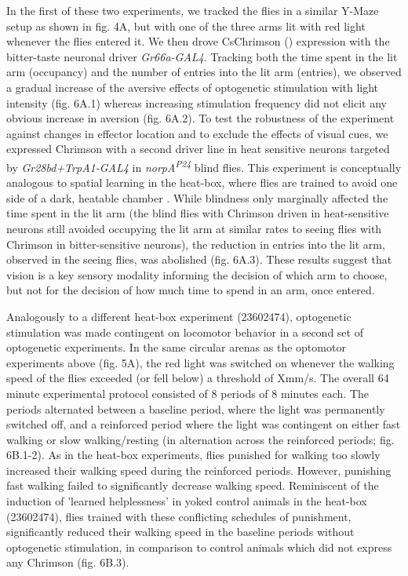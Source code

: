 \documentclass[10pt]{article}
\begin{document}
\begin{multicols}{2}
In the first of these two experiments, we tracked the flies in a similar Y-Maze setup as shown in fig. 4A, but with one of the three arms lit with red light whenever the flies entered it. We then drove CsChrimson (\cite{griebel_2014,Klapoetke_Independent_2014}) expression with the bitter-taste neuronal driver \textit{Gr66a-GAL4}. Tracking both the time spent in the lit arm (occupancy) and the number of entries into the lit arm (entries), we observed a gradual increase of the aversive effects of optogenetic stimulation with light intensity (fig. 6A.1) whereas increasing stimulation frequency did not elicit any obvious increase in aversion (fig. 6A.2). To test the robustness of the experiment against changes in effector location and to exclude the effects of visual cues, we expressed Chrimson with a second driver line in heat sensitive neurons targeted by \textit{Gr28bd+TrpA1-GAL4} in \textit{norpA\textsuperscript{P24}} blind flies. This experiment is conceptually analogous to spatial learning in the heat-box, where flies are trained to avoid one side of a dark, heatable chamber \cite{wustmann_rein_wolf_heisenberg_1996,wustmann_heisenberg_1997,diegelmann_2006,ostrowski_kahsai_kramer_knutson_zars_2015,putz_2002,sitaraman_zars_zars_2007,sitaraman_zars_zars_2010,zars_zars_2006}. While blindness only marginally affected the time spent in the lit arm (the blind flies with Chrimson driven in heat-sensitive neurons still avoided occupying the lit arm at similar rates to seeing flies with Chrimson in bitter-sensitive neurons), the reduction in entries into the lit arm, observed in the seeing flies, was abolished (fig. 6A.3). These results suggest that vision is a key sensory modality informing the decision of which arm to choose, but not for the decision of how much time to spend in an arm, once entered.

Analogously to a different heat-box experiment (23602474), optogenetic stimulation was  made contingent on locomotor behavior in a second set of optogenetic experiments. In the same circular arenas as the optomotor experiments above (fig. 5A), the red light was switched on whenever the walking speed of the flies exceeded (or fell below) a threshold of Xmm/s. The overall 64 minute experimental protocol consisted of 8 periods of 8 minutes each. The periods alternated between a baseline period, where the light was permanently switched off, and a reinforced period where the light was contingent on either fast walking or slow walking/resting (in alternation across the reinforced periods; fig. 6B.1-2). As in the heat-box experiments, flies punished for walking too slowly increased their walking speed during the reinforced periods. However, punishing fast walking failed to significantly decrease walking speed. Reminiscent of the induction of 'learned helplessness' in yoked control animals in the heat-box (23602474), flies trained with these conflicting schedules of punishment, significantly reduced their walking speed in the baseline periods without optogenetic stimulation, in comparison to control animals which did not express any Chrimson (fig. 6B.3).



\end{multicols}
\end{document}
